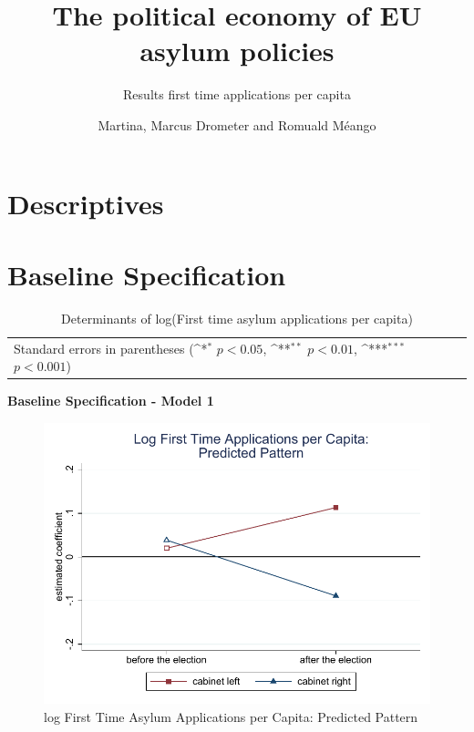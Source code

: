\documentclass[10pt,a4paper]{scrartcl}
\begin{document}
	\title{The political economy of EU asylum policies}
	\subtitle{Results first time applications per capita}
	\author{Martina, Marcus Drometer and Romuald Méango}
	\maketitle


\tableofcontents

\clearpage
\FloatBarrier
\section{Descriptives}

 
 
 
 
 
 
\clearpage
\FloatBarrier
\section{Baseline Specification}
\begin{table}[!ht]\centering
\renewcommand{\arraystretch}{1.25}
\small
\def\sym#1{\ifmmode^{#1}\else\(^{#1}\)\fi}
\caption{Determinants of log(First time asylum applications per capita)}
\begin{tabular}{l*{3}{c}}
	\hline\hline
	
	\hline\hline
	\multicolumn{4}{l}{\footnotesize Standard errors in parentheses (\sym{*} \(p<0.05\), \sym{**} \(p<0.01\), \sym{***} \(p<0.001\))}\\
\end{tabular}
\end{table}

\clearpage
\textbf{Baseline Specification - Model 1}
\begin{figure}[!ht]
	\centering
	\includegraphics[width=1\textwidth]{figures_edited/app_graph1_baseline.pdf}
	\caption{log First Time Asylum Applications per Capita: Predicted Pattern}
\end{figure}
\end{document}
